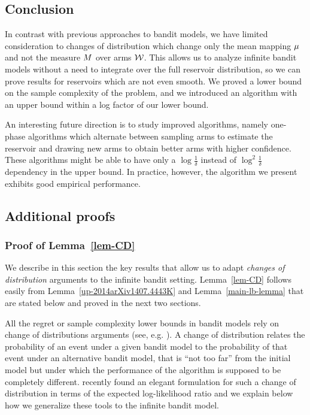 \subsection{Conclusion}\label{sec-conclusion}
In contrast with previous approaches to bandit models, we have
limited consideration to changes of distribution which change only the mean mapping 
$\mu$ and not the measure $M$ over arms $\mathcal{W}$.
This allows us to analyze infinite bandit models without a need to integrate
over the full reservoir distribution, so we can prove results for reservoirs
which are not even smooth.
We proved a lower bound on the sample complexity of the problem,
and we introduced an algorithm with an upper bound within a log factor of our
lower bound.

An interesting future direction is to study improved algorithms, namely
one-phase algorithms which alternate between sampling arms to estimate the 
reservoir and drawing new arms to obtain better arms with higher confidence.
These algorithms might be able to have only a $\log\frac{1}{\delta}$ instead of
$\log^2 \frac{1}{\delta}$ dependency in the upper bound.
In practice, however, the algorithm we present exhibits good empirical 
performance.

\newpage
%

\subsection{Additional proofs}\label{supp-proofs}

\subsubsection{Proof of Lemma~\ref{lem-CD}} \label{proof-CD}

We describe in this section the key results that allow us to adapt
\emph{changes of distribution} arguments to the infinite bandit setting.
Lemma~\ref{lem-CD} follows easily from Lemma~\ref{up-2014arXiv1407.4443K} and 
Lemma~\ref{main-lb-lemma} that are stated below and proved in the next two sections.

All the regret or sample complexity lower bounds in bandit models rely on
change of distributions arguments (see, e.g.
\cite{LaiRobbins85bandits,BurnKat96,Bubeck10BestArm}). A change of distribution
relates the probability of an event under a given bandit model to the
probability of that event under an alternative bandit model, that is ``not too
far'' from the initial model but under which the performance of the algorithm
is supposed to be completely different. \cite{Combes14Lip,JMLR15} recently
found an elegant formulation for such a change of distribution in terms of the
expected log-likelihood ratio and we explain below how we generalize these
tools to the infinite bandit model.

